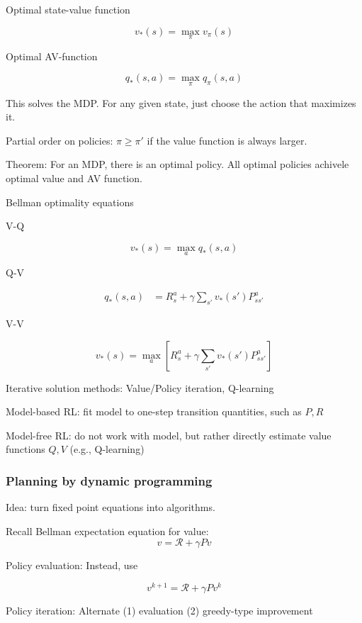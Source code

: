 \documentclass[english]{article}
\begin{document}
\item Optimal state-value function

$$v_*(s) = \max_\pi v_\pi(s)$$

Optimal AV-function

$$q_*(s,a) = \max_\pi q_\pi(s,a)$$

This solves the MDP. For any given state, just choose the action that maximizes it.

Partial order on policies: $\pi \ge \pi'$ if the value function is always larger.

Theorem: For an MDP, there is an optimal policy. All optimal policies achivele optimal value and AV function.

\item Bellman optimality equations


V-Q

$$v_*(s) = \max_{a} q_*(s,a)$$

Q-V

\begin{align*}
q_*(s,a) &= R_s^a +\gamma 
\sum_{s'} v_*(s')P_{ss'}^a
\end{align*}

V-V

$$v_*(s) 
= \max_{a} 
[R_s^a +\gamma 
\sum_{s'} v_*(s')P_{ss'}^a]$$

\item Iterative solution methods: Value/Policy iteration, Q-learning

\item Model-based RL: fit model to one-step transition quantities, such as $P,R$

Model-free RL: do not work with model, but rather directly estimate value functions $Q,V$ (e.g., Q-learning)

\eenum


\subsubsection{Planning by dynamic programming}
\benum

\item Idea: turn fixed point equations into algorithms.

\item Recall Bellman expectation equation for value: 
$$
v = \mathcal{R} + \gamma Pv
$$

Policy evaluation: Instead, use 

$$
v^{k+1} = \mathcal{R} + \gamma Pv^{k}
$$

\item Policy iteration: Alternate (1) evaluation (2) greedy-type improvement
\end{document}

